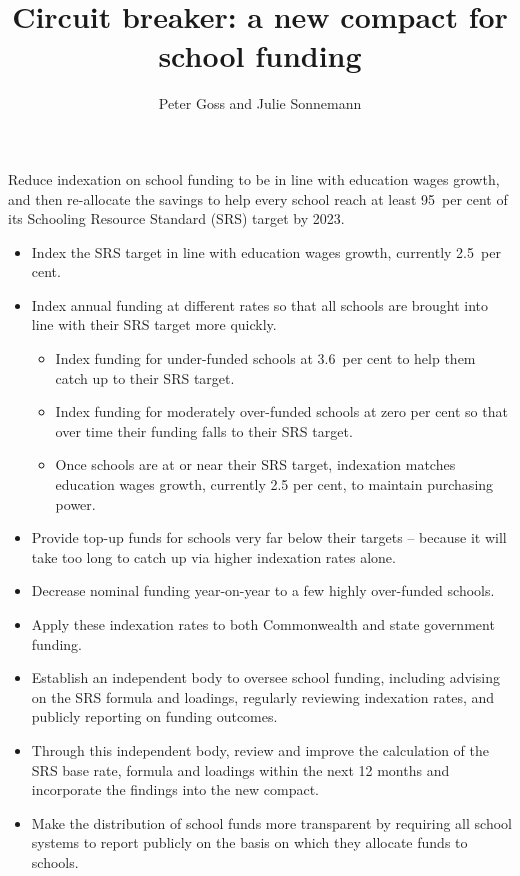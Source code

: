 \documentclass{grattan}
\title{Circuit breaker: a new compact for school funding}
\author{Peter Goss and Julie Sonnemann}
\begin{document}




\label{chap:recommendations}

\label{rec:recommendation-1-achieve-needs-based-funding-by-2023}
Reduce indexation on school funding to be in line with education wages growth, and then re-allocate the savings to help every school reach at least 95~per cent of its Schooling Resource Standard (SRS) target by 2023.

\begin{itemize}
  \raggedright
    \item Index the SRS target in line with education wages growth, currently 2.5~per cent.
    \item Index annual funding at different rates so that all schools are brought into line with their SRS target more quickly.
    \begin{itemize}
        \item Index funding for under-funded schools at 3.6~per cent to help them catch up to their SRS target.
        \item Index funding for moderately over-funded schools at zero per cent so that over time their funding falls to their SRS target.
        \item Once schools are at or near their SRS target, indexation matches education wages growth, currently 2.5 per cent, to maintain purchasing power.
    \end{itemize}
    \item Provide top-up funds for schools very far below their targets -- because it will take too long to catch up via higher indexation rates alone.
    \item Decrease nominal funding year-on-year to a few highly over-funded schools.
    \item Apply these indexation rates to both Commonwealth and state government funding.
\end{itemize}

\oneraggedpage \pagebreak
{}\label{rec:recommendation-2-strengthen-governance-of-school-funding}

\begin{itemize}
    \item Establish an independent body to oversee school funding, including advising on the SRS formula and loadings, regularly reviewing indexation rates, and publicly reporting on funding outcomes.
    \item Through this independent body, review and improve the calculation of the SRS base rate, formula and loadings within the next 12 months and incorporate the findings into the new compact.
    \item Make the distribution of school funds more transparent by requiring all school systems to report publicly on the basis on which they allocate funds to schools.
\end{itemize}
\end{document}
